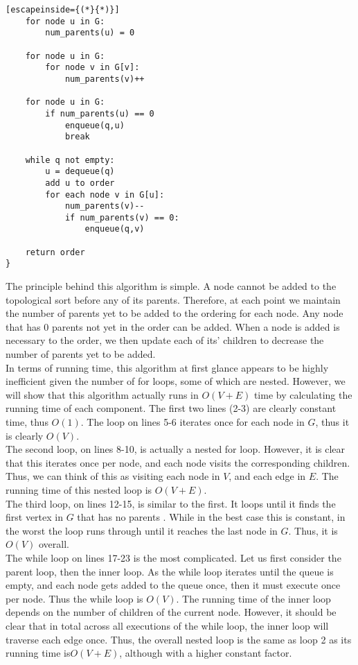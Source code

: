 \documentclass{article}
\begin{document}
\begin{enumerate}
\begin{lstlisting}[escapeinside={(*}{*)}]
	for node u in G:
		num_parents(u) = 0
	
	for node u in G:
		for node v in G[v]:
			num_parents(v)++
			
	for node u in G:
		if num_parents(u) == 0
			enqueue(q,u)
			break	

	while q not empty:
		u = dequeue(q)
		add u to order
		for each node v in G[u]:
			num_parents(v)--
			if num_parents(v) == 0:
				enqueue(q,v)

	return order
}
\end{lstlisting}
	The principle behind this algorithm is simple. A node cannot be added to the topological sort before any of its parents. Therefore, at each point we maintain the number of parents yet to be added to the ordering for each node. Any node that has 0 parents not yet in the order can be added. When a node is added is necessary to the order, we then update each of its' children to decrease the number of parents yet to be added.
	\\ In terms of running time, this algorithm at first glance appears to be highly inefficient given the number of for loops, some of which are nested. However, we will show that this algorithm actually runs in $O(V+E)$ time by calculating the running time of each component. The first two lines (2-3) are clearly constant time, thus $O(1)$. The loop on lines 5-6 iterates once for each node in $G$, thus it is clearly $O(V)$. 
	\\ The second loop, on lines 8-10, is actually a nested for loop. However, it is clear that this iterates once per node, and each node visits the corresponding children. Thus, we can think of this as visiting each node in $V$, and each edge in $E$. The running time of this nested loop is $O(V+E)$.
	\\ The third loop, on lines 12-15, is similar to the first. It loops until it finds the first vertex in $G$ that has no parents . While in the best case this is constant, in the worst the loop runs through until it reaches the last node in $G$. Thus, it is $O(V)$ overall.
	\\ The while loop on lines 17-23 is the most complicated. Let us first consider the parent loop, then the inner loop. As the while loop iterates until the queue is empty, and each node gets added to the queue once, then it must execute once per node. Thus the while loop is $O(V)$. The running time of the inner loop depends on the number of children of the current node. However, it should be clear that in total across all executions of the while loop, the inner loop will traverse each edge once. Thus, the overall nested loop is the same as loop 2 as its running time is$O(V+E)$, although with a higher constant factor.

\end{enumerate}
\end{document}
